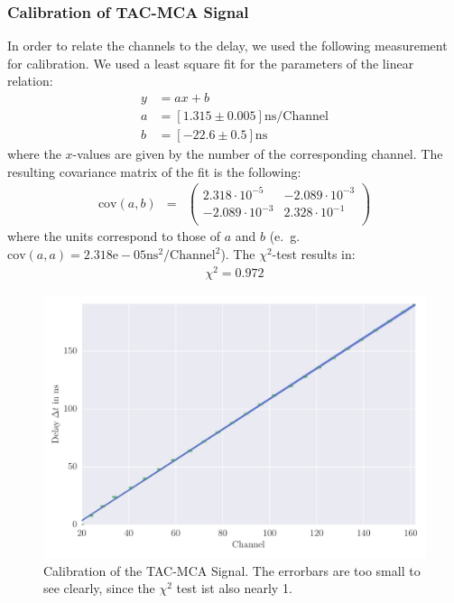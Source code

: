 \subsubsection{Calibration of TAC-MCA Signal}
\label{subs:calib_TAC}
In order to relate the channels to the delay, we used the following
measurement for calibration. We used a least square fit for the parameters
of the linear relation:
\begin{align}
    \label{eq:coeff}
    y &= ax + b \\
    a &= \left[ 1.315 \pm 0.005 \right] \mathrm{ns} / \mathrm{Channel}\\
    b &= \left[ -22.6 \pm 0.5 \right]\mathrm{ns} 
\end{align}
where the $x$-values are given by the number of the corresponding channel. 
The resulting covariance matrix of the fit is the following:
\begin{align}
    \label{eq:cov}
    \mathrm{cov}(a, b) &=& 
    \begin{pmatrix}
        2.318 \cdot 10^{-5} &-2.089\cdot 10^{-3}\\
        -2.089\cdot 10^{-3}&2.328\cdot 10^{-1}\\
    \end{pmatrix}
\end{align}
where the units correspond to those of $a$ and $b$ 
(e.~g. $\mathrm{cov}(a,a) = 2.318\mathrm{e}-05 \mathrm{ns^2} / \mathrm{Channel}^2$).
The $\chi^2$-test results in:
\begin{align}
    \label{eq:}
   \chi^2 = 0.972
\end{align}

\label{sub:calibration_of_tac_mca_signal}
\begin{figure}[htpb]
    \centering
    \includegraphics[width=1.0\linewidth]{analysis/figures/plot7}
    \caption{Calibration of the TAC-MCA Signal. The errorbars are too small
        to see clearly, since the $\chi^2$ test ist also nearly 1.}
    \label{fig:plot7}
\end{figure}



